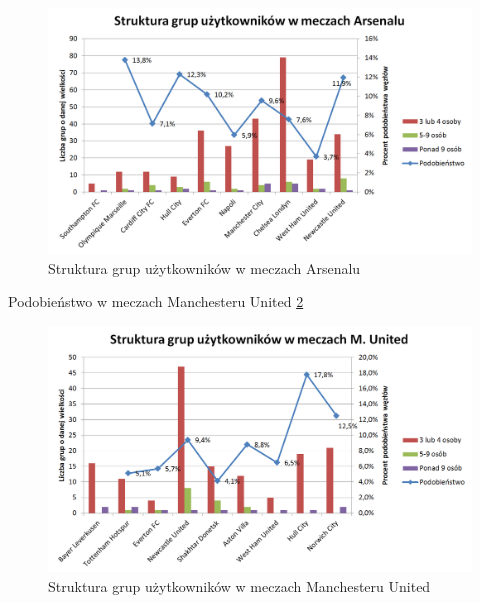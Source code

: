 \begin{figure}[ht!]
\centering
\includegraphics[width=120mm]{img/grupy-arsenal.png}
\caption{Struktura grup użytkowników w meczach Arsenalu}
\label{image:grupy-arsenal}
\end{figure}

Podobieństwo w meczach Manchesteru United \ref{image:grupy-munited}

\begin{figure}[ht!]
\centering
\includegraphics[width=120mm]{img/grupy-munited.png}
\caption{Struktura grup użytkowników w meczach Manchesteru United}
\label{image:grupy-munited}
\end{figure}


